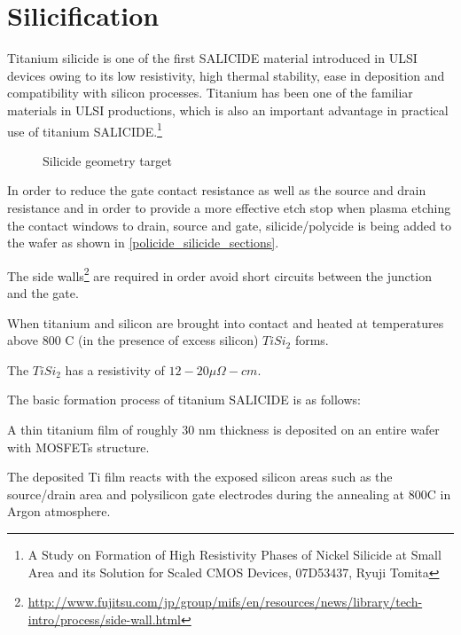 \section{Silicification}\label{step_silicification}

Titanium silicide is one of the first SALICIDE material introduced in ULSI devices owing to its low resistivity, high thermal stability, ease in deposition and compatibility with silicon processes.
Titanium has been one of the familiar materials in ULSI productions, which is also an important advantage in practical use of titanium SALICIDE.\footnote{A Study on Formation of High Resistivity Phases of Nickel Silicide at Small Area and its Solution for Scaled CMOS Devices, 07D53437, Ryuji Tomita}

\begin{figure}[H]
	\centering
	\begin{tikzpicture}[node distance = 3cm, auto, thick,scale=\CrossAndTopSectionBig, every node/.style={transform shape}]
		
	\end{tikzpicture}
	\caption{Silicide geometry target}
	\label{policide_silicide_sections}
\end{figure}

In order to reduce the gate contact resistance as well as the source and drain resistance and in order to provide a more effective etch stop when plasma etching the contact windows to drain, source and gate, silicide/polycide is being added to the wafer as shown in \autoref{policide_silicide_sections}.

The side walls\footnote{\url{http://www.fujitsu.com/jp/group/mifs/en/resources/news/library/tech-intro/process/side-wall.html}} are required in order avoid short circuits between the junction and the gate.

When titanium and silicon are brought into contact and heated at temperatures above 800 \degree C (in the presence of excess silicon) $Ti Si_2$ forms.

The $TiSi_2$ has a resistivity of $12-20 \mu\Omega - cm$.

The basic formation process of titanium SALICIDE is as follows:

A thin titanium film of roughly 30 nm thickness is deposited on an entire wafer with MOSFETs structure.

The deposited Ti film reacts with the exposed silicon areas such as the source/drain area and polysilicon gate electrodes during the annealing at 800\degree C in Argon atmosphere.

